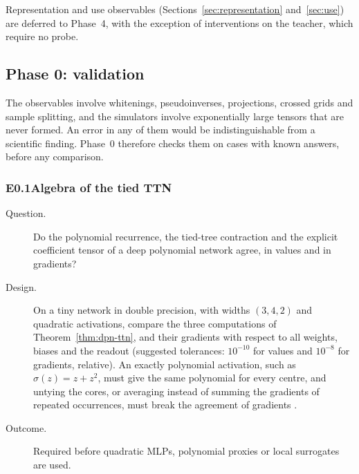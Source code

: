 \documentclass[11pt]{article}
\theoremstyle{definition}
\numberwithin{equation}{section}
\begin{document}
Representation and use observables (Sections~\ref{sec:representation} and~\ref{sec:use}) are deferred to Phase~4, with the exception of interventions on the teacher, which require no probe.

\subsection{Phase 0: validation}\label{sec:exp-phase0}

The observables involve whitenings, pseudoinverses, projections, crossed grids and sample splitting, and the simulators involve exponentially large tensors that are never formed. An error in any of them would be indistinguishable from a scientific finding. Phase~0 therefore checks them on cases with known answers, before any comparison.

\subsubsection*{E0.1\quad Algebra of the tied TTN}
\begin{description}
\item[Question.] Do the polynomial recurrence, the tied-tree contraction and the explicit coefficient tensor of a deep polynomial network agree, in values and in gradients?
\item[Design.] On a tiny network in double precision, with widths $(3,4,2)$ and quadratic activations, compare the three computations of Theorem~\ref{thm:dpn-ttn}, and their gradients with respect to all weights, biases and the readout (suggested tolerances: $10^{-10}$ for values and $10^{-8}$ for gradients, relative). An exactly polynomial activation, such as $\sigma(z)=z+z^2$, must give the same polynomial for every centre, and untying the cores, or averaging instead of summing the gradients of repeated occurrences, must break the agreement of gradients \citep[Section~8.1]{hfl_surrogate}.
\item[Outcome.] Required before quadratic MLPs, polynomial proxies or local surrogates are used.
\end{description}
\end{document}
